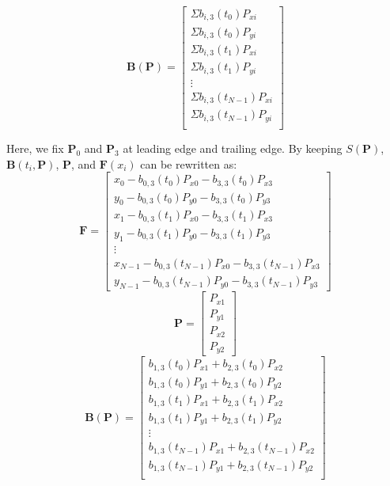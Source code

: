 \begin{equation*}
    \mathbf{B}(\mathbf{P}) =
    \begin{bmatrix}
        \Sigma b_{i,3}(t_0)P_{xi} \\
        \Sigma b_{i,3}(t_0)P_{yi} \\
        \Sigma b_{i,3}(t_1)P_{xi} \\
        \Sigma b_{i,3}(t_1)P_{yi} \\
        \vdots \\
        \Sigma b_{i,3}(t_{N-1})P_{xi} \\
        \Sigma b_{i,3}(t_{N-1})P_{yi} \\
    \end{bmatrix}
\end{equation*}

Here, we fix $\mathbf{P}_0$ and $\mathbf{P}_3$ at leading edge and trailing edge. By keeping $S(\mathbf{P})$,
$\mathbf{B}(t_i, \mathbf{P})$, $\mathbf{P}$, and $\mathbf{F}(x_i)$ can be rewritten as:
\begin{equation*}
    \mathbf{F} =
    \begin{bmatrix}
        x_0 - b_{0,3}(t_0)P_{x0} - b_{3,3}(t_0)P_{x3} \\
        y_0 - b_{0,3}(t_0)P_{y0} - b_{3,3}(t_0)P_{y3} \\
        x_1 - b_{0,3}(t_1)P_{x0} - b_{3,3}(t_1)P_{x3} \\
        y_1 - b_{0,3}(t_1)P_{y0} - b_{3,3}(t_1)P_{y3} \\
        \vdots \\
        x_{N-1} - b_{0,3}(t_{N-1} )P_{x0} - b_{3,3}(t_{N-1} )P_{x3} \\
        y_{N-1} - b_{0,3}(t_{N-1} )P_{y0} - b_{3,3}(t_{N-1} )P_{y3} 
    \end{bmatrix}
\end{equation*}
\begin{equation*}
    \mathbf{P} =
    \begin{bmatrix}
        P_{x1} \\ P_{y1} \\ P_{x2} \\ P_{y2}
    \end{bmatrix}
\end{equation*}
\begin{equation*}
    \mathbf{B}(\mathbf{P}) =
    \begin{bmatrix}
        b_{1,3}(t_0)P_{x1} + b_{2,3}(t_0)P_{x2} \\
        b_{1,3}(t_0)P_{y1} + b_{2,3}(t_0)P_{y2} \\
        b_{1,3}(t_1)P_{x1} + b_{2,3}(t_1)P_{x2} \\
        b_{1,3}(t_1)P_{y1} + b_{2,3}(t_1)P_{y2} \\
        \vdots \\
        b_{1,3}(t_{N-1})P_{x1} + b_{2,3}(t_{N-1})P_{x2} \\
        b_{1,3}(t_{N-1})P_{y1} + b_{2,3}(t_{N-1})P_{y2} \\
    \end{bmatrix}
\end{equation*}
